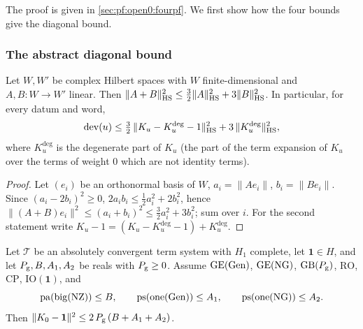 The proof is given in \cref{sec:pf:open0:fourpf}. We first show how the four bounds give the diagonal bound.

\subsubsection{The abstract diagonal bound}

\begin{lemma}\label{pf:open0:threehalves}
Let $W,W'$ be complex Hilbert spaces with $W$ finite-dimensional and $A,B\colon W\to W'$ linear. Then
$\|A+B\|_{\mathrm{HS}}^2\le\frac32\|A\|_{\mathrm{HS}}^2+3\|B\|_{\mathrm{HS}}^2$. In particular, for every datum and word,
\[
\operatorname{dev}(u)\le\tfrac32\,\|K_u-K_u^{\mathrm{deg}}-1\|_{\mathrm{HS}}^2+3\,\|K_u^{\mathrm{deg}}\|_{\mathrm{HS}}^2,
\]
where $K_u^{\mathrm{deg}}$ is the degenerate part of $K_u$ (the part of the term expansion of $K_u$ over the terms of weight $0$
which are not identity terms).
\
\
\end{lemma}

\begin{proof}
Let $(e_i)$ be an orthonormal basis of $W$, $a_i=\|Ae_i\|$, $b_i=\|Be_i\|$. Since $(a_i-2b_i)^2\ge0$, $2a_ib_i\le\frac12a_i^2+2b_i^2$,
hence $\|(A+B)e_i\|^2\le(a_i+b_i)^2\le\frac32a_i^2+3b_i^2$; sum over $i$. For the second statement write
$K_u-1=(K_u-K_u^{\mathrm{deg}}-1)+K_u^{\mathrm{deg}}$.
\end{proof}

\begin{lemma}[Abstract diagonal bound]\label{pf:open0:abstract}
Let $\mathcal T$ be an absolutely convergent term system with $H_1$ complete, let $\mathbf 1\in H$, and let $P_{\mathrm g},B,A_1,A_2$ be
reals with $P_{\mathrm g}\ge0$. Assume $\mathrm{GE}(\mathrm{Gen})$, $\mathrm{GE}(\mathrm{NG})$, $\mathrm{GB}(P_{\mathrm g})$,
$\mathrm{RO}$, $\mathrm{CP}$, $\mathrm{IO}(\mathbf 1)$, and
\[
\operatorname{pa}(\operatorname{big}(\mathrm{NZ}))\le B,\qquad\operatorname{ps}(\operatorname{one}(\mathrm{Gen}))\le A_1,\qquad
\operatorname{ps}(\operatorname{one}(\mathrm{NG}))\le A_2 .
\]
Then $\|K_0-\mathbf 1\|^2\le2\,P_{\mathrm g}\,(B+A_1+A_2)$.
\
\end{lemma}

